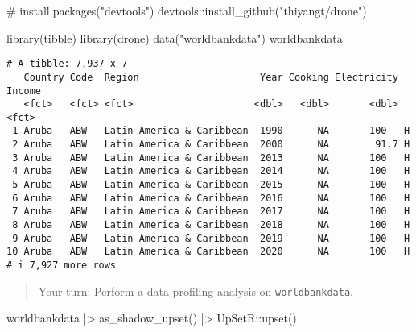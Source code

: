 \documentclass[
  letterpaper,
  DIV=11,
  numbers=noendperiod]{scrreprt}
\newenvironment{Shaded}{\begin{snugshade}}{\end{snugshade}}
\newcommand{\CommentTok}[1]{\textcolor[rgb]{0.37,0.37,0.37}{#1}}
\newcommand{\FunctionTok}[1]{\textcolor[rgb]{0.28,0.35,0.67}{#1}}
\newcommand{\NormalTok}[1]{\textcolor[rgb]{0.00,0.23,0.31}{#1}}
\newcommand{\SpecialCharTok}[1]{\textcolor[rgb]{0.37,0.37,0.37}{#1}}
\newcommand{\StringTok}[1]{\textcolor[rgb]{0.13,0.47,0.30}{#1}}
\begin{document}
\begin{Shaded}
\begin{Highlighting}[]
\CommentTok{\# install.packages("devtools")}
\NormalTok{devtools}\SpecialCharTok{::}\FunctionTok{install\_github}\NormalTok{(}\StringTok{"thiyangt/drone"}\NormalTok{)}
\end{Highlighting}
\end{Shaded}

\begin{Shaded}
\begin{Highlighting}[]
\FunctionTok{library}\NormalTok{(tibble)}
\FunctionTok{library}\NormalTok{(drone)}
\FunctionTok{data}\NormalTok{(}\StringTok{"worldbankdata"}\NormalTok{)}
\NormalTok{worldbankdata}
\end{Highlighting}
\end{Shaded}

\begin{verbatim}
# A tibble: 7,937 x 7
   Country Code  Region                     Year Cooking Electricity Income
   <fct>   <fct> <fct>                     <dbl>   <dbl>       <dbl> <fct> 
 1 Aruba   ABW   Latin America & Caribbean  1990      NA       100   H     
 2 Aruba   ABW   Latin America & Caribbean  2000      NA        91.7 H     
 3 Aruba   ABW   Latin America & Caribbean  2013      NA       100   H     
 4 Aruba   ABW   Latin America & Caribbean  2014      NA       100   H     
 5 Aruba   ABW   Latin America & Caribbean  2015      NA       100   H     
 6 Aruba   ABW   Latin America & Caribbean  2016      NA       100   H     
 7 Aruba   ABW   Latin America & Caribbean  2017      NA       100   H     
 8 Aruba   ABW   Latin America & Caribbean  2018      NA       100   H     
 9 Aruba   ABW   Latin America & Caribbean  2019      NA       100   H     
10 Aruba   ABW   Latin America & Caribbean  2020      NA       100   H     
# i 7,927 more rows
\end{verbatim}

\begin{quote}
Your turn: Perform a data profiling analysis on \texttt{worldbankdata}.
\end{quote}

\begin{Shaded}
\begin{Highlighting}[]
\NormalTok{worldbankdata }\SpecialCharTok{|\textgreater{}}
  \FunctionTok{as\_shadow\_upset}\NormalTok{() }\SpecialCharTok{|\textgreater{}}
\NormalTok{  UpSetR}\SpecialCharTok{::}\FunctionTok{upset}\NormalTok{()}
\end{Highlighting}
\end{Shaded}
\end{document}
